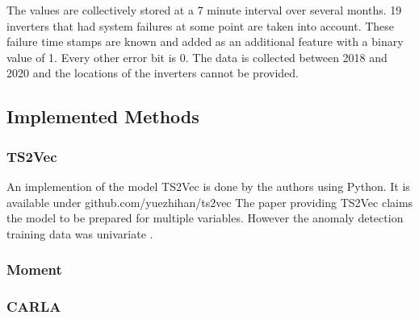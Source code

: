 The values are collectively stored at a 7 minute interval over several months. 19 inverters that had system failures at some point are taken into account. These failure time stamps are known and added as an additional feature with a binary value of 1. Every other error bit is 0. The data is collected between 2018 and 2020 and the locations of the inverters cannot be provided.


\subsection{Implemented Methods}

\subsubsection{TS2Vec}
An implemention of the model TS2Vec is done by the authors using Python. It is available under github.com/yuezhihan/ts2vec
The paper providing TS2Vec claims the model to be prepared for multiple variables. However the anomaly detection training data was univariate .

\subsubsection{Moment}

\subsubsection{CARLA}

